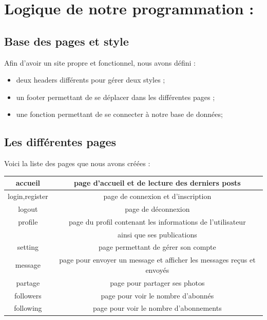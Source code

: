 \documentclass[12pt,a4paper]{article}
\begin{document}
\newpage

\section{Logique de notre programmation :}
\subsection{Base des pages et style}
  Afin d'avoir un site propre et fonctionnel, nous avons défini :
  \begin{itemize}
  \item deux headers différents pour gérer deux styles ;
  \item un footer permettant de se déplacer dans les différentes pages ;
  \item une fonction permettant de se connecter à notre base de données;
  \end{itemize}

\subsection{Les différentes pages}
  Voici la liste des pages que nous avons créées :
  \begin{center}
   \begin{tabular}{|c|c|} %
   \hline
   accueil & page d'accueil et de lecture des derniers posts \\
   \hline
   login,register & page de connexion et d'inscription \\
   \hline
   logout & page de déconnexion \\
   \hline
   profile & page du profil contenant les informations de l'utilisateur \\ & ainsi que ses publications \\
   \hline
   setting & page permettant de gérer son compte \\
   \hline
   message & page pour envoyer un message et afficher les messages reçus et envoyés \\
   \hline
   partage & page pour partager ses photos \\
   \hline
   followers & page pour voir le nombre d'abonnés  \\
   \hline
   following & page pour voir le nombre d'abonnements \\
   \hline
   \end{tabular}
  \end{center}
  
\end{document}
